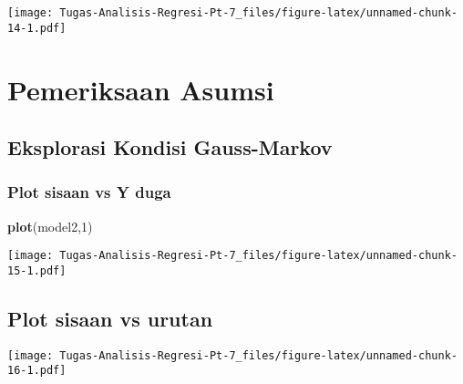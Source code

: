 \documentclass[
]{article}
\newenvironment{Shaded}{\begin{snugshade}}{\end{snugshade}}
\newcommand{\AttributeTok}[1]{\textcolor[rgb]{0.13,0.29,0.53}{#1}}
\newcommand{\DecValTok}[1]{\textcolor[rgb]{0.00,0.00,0.81}{#1}}
\newcommand{\FunctionTok}[1]{\textcolor[rgb]{0.13,0.29,0.53}{\textbf{#1}}}
\newcommand{\NormalTok}[1]{#1}
\newcommand{\SpecialCharTok}[1]{\textcolor[rgb]{0.81,0.36,0.00}{\textbf{#1}}}
\newcommand{\StringTok}[1]{\textcolor[rgb]{0.31,0.60,0.02}{#1}}
\begin{document}
\texttt{[image: Tugas-Analisis-Regresi-Pt-7\_files/figure-latex/unnamed-chunk-14-1.pdf]}

\hypertarget{pemeriksaan-asumsi-1}{%
\section{Pemeriksaan Asumsi}\label{pemeriksaan-asumsi-1}}

\hypertarget{eksplorasi-kondisi-gauss-markov-1}{%
\subsection{Eksplorasi Kondisi
Gauss-Markov}\label{eksplorasi-kondisi-gauss-markov-1}}

\hypertarget{plot-sisaan-vs-y-duga-1}{%
\subsubsection{Plot sisaan vs Y duga}\label{plot-sisaan-vs-y-duga-1}}

\begin{Shaded}
\begin{Highlighting}[]
\FunctionTok{plot}\NormalTok{(model2,}\DecValTok{1}\NormalTok{) }
\end{Highlighting}
\end{Shaded}

\texttt{[image: Tugas-Analisis-Regresi-Pt-7\_files/figure-latex/unnamed-chunk-15-1.pdf]}

\hypertarget{plot-sisaan-vs-urutan-1}{%
\subsection{Plot sisaan vs urutan}\label{plot-sisaan-vs-urutan-1}}

\begin{Shaded}
\end{Shaded}

\texttt{[image: Tugas-Analisis-Regresi-Pt-7\_files/figure-latex/unnamed-chunk-16-1.pdf]}
\end{document}
